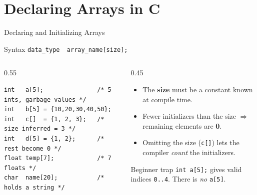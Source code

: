 \documentclass[aspectratio=169]{beamer}
\begin{document}
	\section{Declaring Arrays in C}
	\begin{frame}[fragile]{Declaring and Initializing Arrays}
		\begin{block}{Syntax}
			\centering \texttt{data\_type\ \ array\_name[size];}
		\end{block}
		\begin{columns}[T]
			\begin{column}{0.55\textwidth}
				\begin{lstlisting}
int   a[5];               /* 5 ints, garbage values */
int   b[5] = {10,20,30,40,50};
int   c[]  = {1, 2, 3};   /* size inferred = 3 */
int   d[5] = {1, 2};      /* rest become 0 */
float temp[7];            /* 7 floats */
char  name[20];           /* holds a string */
				\end{lstlisting}
			\end{column}
			\begin{column}{0.45\textwidth}
				\begin{itemize}\small
					\item The \textbf{size} must be a constant known at compile time.
					\item Fewer initializers than the size $\Rightarrow$ remaining elements are \textbf{0}.
					\item Omitting the size (\texttt{c[]}) lets the compiler \emph{count} the initializers.
				\end{itemize}
				\begin{block}{Beginner trap}
					\small \texttt{int a[5];} gives valid indices \texttt{0..4}. There is \emph{no} \texttt{a[5]}.
				\end{block}
			\end{column}
		\end{columns}
	\end{frame}
\end{document}
